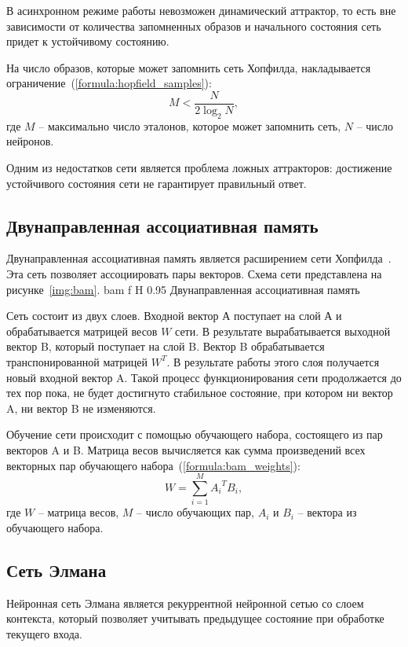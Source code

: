 В асинхронном режиме работы невозможен динамический аттрактор, то есть вне зависимости от количества запомненных образов и начального состояния сеть придет к устойчивому состоянию.

На число образов, которые может запомнить сеть Хопфилда, накладывается ограничение~(\ref{formula:hopfield_samples}):
\begin{equation}\label{formula:hopfield_samples}
	M < \frac{N}{2\log_2N},
\end{equation}
где $M$ -- максимально число эталонов, которое может запомнить сеть, $N$ -- число нейронов.

Одним из недостатков сети является проблема ложных аттракторов: достижение устойчивого состояния сети не гарантирует правильный ответ.

\subsection{Двунаправленная ассоциативная память}
Двунаправленная ассоциативная память является расширением сети Хопфилда~\cite{бахтин2024интеллектуальные}.
Эта сеть позволяет ассоциировать пары векторов.
Схема сети представлена на рисунке~\ref{img:bam}.
{bam} %
{f} %
{H} %
{0.95\textwidth} %
{Двунаправленная ассоциативная память} %

Сеть состоит из двух слоев.
Входной вектор А поступает на слой А и обрабатывается матрицей весов $W$ сети.
В результате вырабатывается выходной вектор B, который поступает на слой B.
Вектор B обрабатывается транспонированной матрицей $W^T$.
В результате работы этого слоя получается новый входной вектор A.
Такой процесс функционирования сети продолжается до тех пор пока, не будет достигнуто стабильное состояние, при котором ни вектор A, ни вектор B не изменяются.

Обучение сети происходит с помощью обучающего набора, состоящего из пар векторов A и B.
Матрица весов вычисляется как сумма произведений всех векторных пар обучающего набора~(\ref{formula:bam_weights}):
\begin{equation}\label{formula:bam_weights}
	W = \sum\limits_{i=1}^{M}{A_i}^T B_i,
\end{equation}
где $W$ -- матрица весов, $M$ -- число обучающих пар, $A_i$ и $B_i$ -- вектора из обучающего набора.

\subsection{Сеть Элмана}
Нейронная сеть Элмана является рекуррентной нейронной сетью со слоем контекста, который позволяет учитывать предыдущее состояние при обработке текущего входа.

